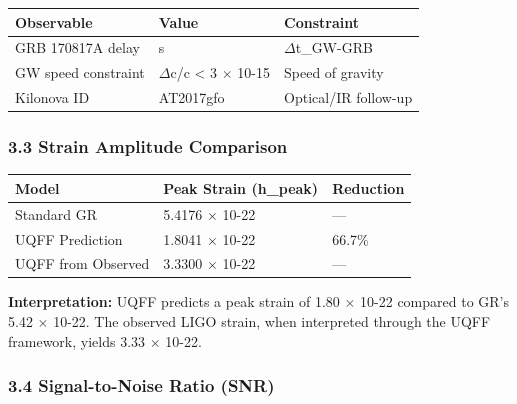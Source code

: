 \documentclass[
  11pt,
]{article}
\newcounter{none} %
\begin{document}
{\def\LTcaptype{none} %
\begin{longtable}[]{@{}
  >{\raggedright\arraybackslash}p{}
  >{\raggedright\arraybackslash}p{}
  >{\raggedright\arraybackslash}p{}@{}}
\toprule\noalign{}
\begin{minipage}[b]{\linewidth}\raggedright
Observable
\end{minipage} & \begin{minipage}[b]{\linewidth}\raggedright
Value
\end{minipage} & \begin{minipage}[b]{\linewidth}\raggedright
Constraint
\end{minipage} \\
\midrule\noalign{}
\endhead
\bottomrule\noalign{}
\endlastfoot
GRB 170817A delay & 1.74 s & $\Delta$t\_GW-GRB \\
GW speed constraint & \textbar{}$\Delta$c/c\textbar{} \textless{} 3
$\times$ 10-15 & Speed of gravity \\
Kilonova ID & AT2017gfo & Optical/IR follow-up \\
\end{longtable}
}

\subsubsection{3.3 Strain Amplitude
Comparison}\label{strain-amplitude-comparison}

{\def\LTcaptype{none} %
\begin{longtable}[]{@{}lll@{}}
\toprule\noalign{}
Model & Peak Strain (h\_peak) & Reduction \\
\midrule\noalign{}
\endhead
\bottomrule\noalign{}
\endlastfoot
Standard GR & 5.4176 $\times$ 10-22 & --- \\
UQFF Prediction & 1.8041 $\times$ 10-22 & 66.7\% \\
UQFF from Observed & 3.3300 $\times$ 10-22 & --- \\
\end{longtable}
}

\textbf{Interpretation:} UQFF predicts a peak strain of 1.80 $\times$
10-22 compared to GR's 5.42 $\times$ 10-22. The observed LIGO strain,
when interpreted through the UQFF framework, yields 3.33 $\times$
10-22.

\subsubsection{3.4 Signal-to-Noise Ratio
(SNR)}\label{signal-to-noise-ratio-snr}
\end{document}
